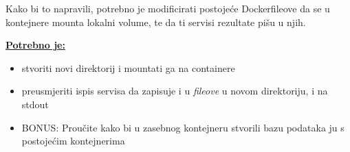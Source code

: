 \documentclass[12pt,a4paper]{article}
\begin{document}
Kako bi to napravili, potrebno je modificirati postojeće Dockerfileove da se u kontejnere mounta lokalni volume, te da ti servisi rezultate pišu u njih.


\underline{\textbf{Potrebno je:}}
\begin{itemize}
	\item stvoriti novi direktorij i mountati ga na containere
	\item preusmjeriti ispis servisa da zapisuje i u \textit{fileove} u novom direktoriju, i na stdout
	\item BONUS: Proučite kako bi u zasebnog kontejneru stvorili bazu podataka  ju s postojećim kontejnerima
\end{itemize}
\end{document}
